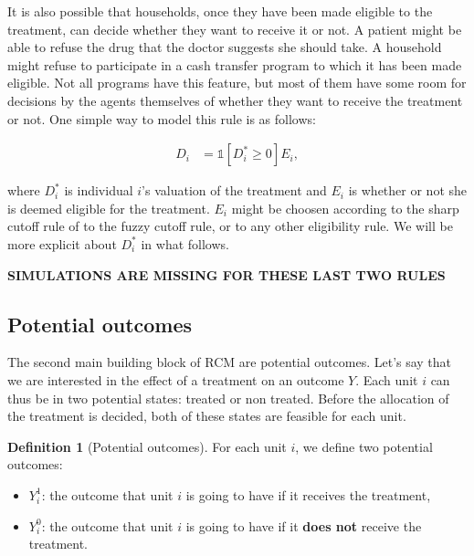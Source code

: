 \documentclass[
]{book}
\providecommand{\tightlist}{%
  \setlength{\itemsep}{0pt}\setlength{\parskip}{0pt}}
\newcommand{\uns}[1]{\mathds{1}[ #1 ]}
\theoremstyle{definition}
\newtheorem{definition}{Definition}[chapter]
\theoremstyle{definition}
\theoremstyle{definition}
\theoremstyle{definition}
\theoremstyle{remark}
\begin{document}
It is also possible that households, once they have been made eligible to the treatment, can decide whether they want to receive it or not.
A patient might be able to refuse the drug that the doctor suggests she should take.
A household might refuse to participate in a cash transfer program to which it has been made eligible.
Not all programs have this feature, but most of them have some room for decisions by the agents themselves of whether they want to receive the treatment or not.
One simple way to model this rule is as follows:

\begin{align}\label{eq:eligself}
  D_i & = \uns{D^*_i\geq0}E_i,
\end{align}

where \(D^*_i\) is individual \(i\)'s valuation of the treatment and \(E_i\) is whether or not she is deemed eligible for the treatment.
\(E_i\) might be choosen according to the sharp cutoff rule of to the fuzzy cutoff rule, or to any other eligibility rule.
We will be more explicit about \(D_i^*\) in what follows.

\textbf{SIMULATIONS ARE MISSING FOR THESE LAST TWO RULES}

\hypertarget{potential-outcomes}{%
\subsection{Potential outcomes}\label{potential-outcomes}}

The second main building block of RCM are potential outcomes.
Let's say that we are interested in the effect of a treatment on an outcome \(Y\).
Each unit \(i\) can thus be in two potential states: treated or non treated.
Before the allocation of the treatment is decided, both of these states are feasible for each unit.

\begin{definition}[Potential outcomes]
\protect\hypertarget{def:unnamed-chunk-2}{}{\label{def:unnamed-chunk-2} \iffalse (Potential outcomes) \fi{} }For each unit \(i\), we define two potential outcomes:
\end{definition}

\begin{itemize}
\tightlist
\item
  \(Y_i^1\): the outcome that unit \(i\) is going to have if it receives the treatment,
\item
  \(Y_i^0\): the outcome that unit \(i\) is going to have if it \textbf{does not} receive the treatment.
\end{itemize}
\end{document}
